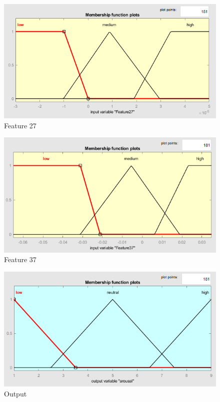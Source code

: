 \documentclass[a4paper]{report}
\begin{document}
	\begin{figure}[htbp]
		\centering
		\includegraphics[scale=1]{img/input2_fuzzy.png}
		\caption{Feature 27}
		\label{img: input2_fuzzy}
	\end{figure}

	\begin{figure}[htbp]
		\centering
		\includegraphics[scale=1]{img/input3_fuzzy.png}
		\caption{Feature 37}
		\label{img: input3_fuzzy}
	\end{figure}

	\begin{figure}[htbp]
		\centering
		\includegraphics[scale=1]{img/output_fuzzy.png}
		\caption{Output}
		\label{img: output_fuzzy}
	\end{figure}
	
\end{document}

